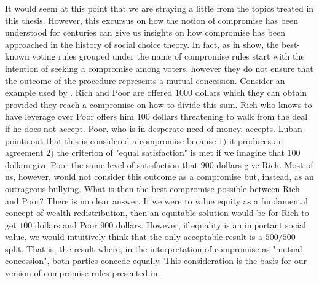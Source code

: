 It would seem at this point that we are straying a little from the topics treated in this thesis. However, this excursus on how the notion of compromise has been understood for centuries can give us insights on how compromise has been approached in the history of social choice theory. In fact, as  in  show, the best-known voting rules grouped under the name of compromise rules start with the intention of seeking a compromise among voters, however they do not ensure that the outcome of the procedure represents a mutual concession.
Consider an example used by \cite{Luban1985}. Rich and Poor are offered $1000$ dollars which they can obtain provided they reach a compromise on how to divide this sum. 
Rich who knows to have leverage over Poor offers him $100$ dollars threatening to walk from the deal if he does not accept. Poor, who is in desperate need of money, accepts.
Luban points out that this is considered a compromise because $1)$ it produces an agreement $2)$ the criterion of "equal satisfaction" is met if we imagine that $100$ dollars give Poor the same level of satisfaction that $900$ dollars give Rich. Most of us, however, would not consider this outcome as a compromise but, instead, as an outrageous bullying. 
What is then the best compromise possible between Rich and Poor? There is no clear answer.
If we were to value equity as a fundamental concept of wealth redistribution, then an equitable solution would be for Rich to get $100$ dollars and Poor $900$ dollars.
However, if equality is an important social value, we would intuitively think that the only acceptable result is a $500/500$ split. That is, the result where, in the interpretation of compromise as "mutual concession", both parties concede equally.
This consideration is the basis for our version of compromise rules presented in .

